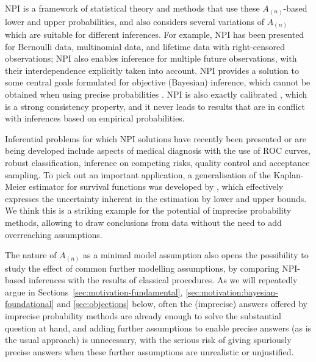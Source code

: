 NPI is a framework of statistical theory and methods that use these $A_{(n)}$-based lower and upper probabilities,
and also considers several variations of $A_{(n)}$ which are suitable for different inferences.
For example, NPI has been presented for Bernoulli data, multinomial data, and lifetime data with right-censored observations;
NPI also enables inference for multiple future observations, with their interdependence explicitly taken into account.
NPI provides a solution to some central goals formulated for objective (Bayesian) inference,
which cannot be obtained when using precise probabilities \parencite{2006b:Coolen}.
NPI is also exactly calibrated \parencite{2005:lawless}, which is a strong consistency property,
and it never leads to results that are in conflict with inferences based on empirical probabilities.

Inferential problems for which NPI solutions have recently been presented or are being developed
include aspects of medical diagnosis with the use of ROC curves, 
robust classification, inference on competing risks, quality control and acceptance sampling.
To pick out an important application, %
a generalisation of the Kaplan-Meier estimator for survival functions \parencite{1958:kaplan}
was developed by \textcite{2004:Coolen:Yan},
which effectively expresses the uncertainty inherent in the estimation by lower and upper bounds.
We think this is a striking example for the potential of imprecise probability methods,
allowing to draw conclusions from data without the need to add overreaching assumptions.

The nature of $A_{(n)}$ as a minimal model assumption also
opens the possibility to study the effect of common further modelling assumptions,
by comparing NPI-based inferences with the results of classical procedures. %
As we will repeatedly argue in Sections~\ref{sec:motivation-fundamental},
\ref{sec:motivation:bayesian-foundational} and \ref{sec:objections} below,
often the (imprecise) answers offered by imprecise probability methods are already enough %
to solve the substantial question at hand,
and adding further assumptions to enable precise answers (as is the usual approach) is unnecessary,
with the serious risk of giving spuriously precise answers
when these further assumptions are unrealistic or unjustified.

\medskip

